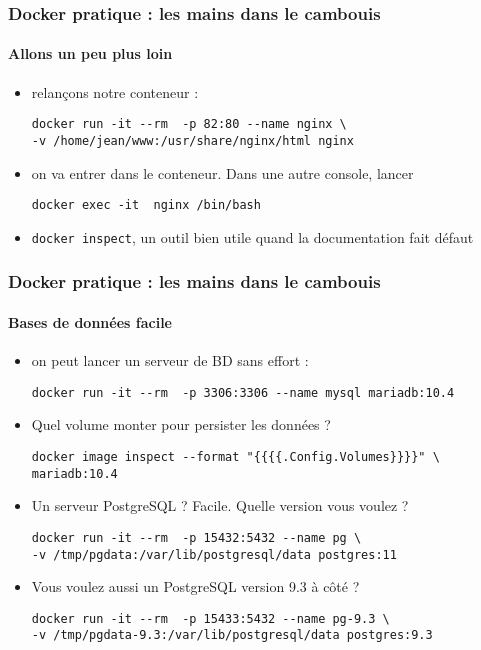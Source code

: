 \documentclass[11pt]{beamer}
\begin{document}
\begin{frame}[fragile]
\frametitle{Docker pratique : les mains dans le cambouis }
\framesubtitle{Allons un peu plus loin}
\begin{itemize}
	\item relançons notre conteneur : 
	\begin{lstlisting}
docker run -it --rm  -p 82:80 --name nginx \
-v /home/jean/www:/usr/share/nginx/html nginx
	\end{lstlisting}
	\item on va entrer dans le conteneur. Dans une autre console, lancer
	\begin{lstlisting}
docker exec -it  nginx /bin/bash
	\end{lstlisting}
	\item \verb|docker inspect|, un outil bien utile quand la documentation fait défaut
\end{itemize}
\end{frame}

\begin{frame}[fragile]
\frametitle{Docker pratique : les mains dans le cambouis }
\framesubtitle{Bases de données facile}
\begin{itemize}
	\item on peut lancer un serveur de BD sans effort : 
	\begin{lstlisting}
docker run -it --rm  -p 3306:3306 --name mysql mariadb:10.4
	\end{lstlisting}
	\item Quel volume monter pour persister les données ?
	\begin{lstlisting}
docker image inspect --format "{{{{.Config.Volumes}}}}" \
mariadb:10.4
	\end{lstlisting}
	\item Un serveur PostgreSQL ? Facile. Quelle version vous voulez ?
	\begin{lstlisting}
docker run -it --rm  -p 15432:5432 --name pg \ 
-v /tmp/pgdata:/var/lib/postgresql/data postgres:11
	\end{lstlisting}
	\item Vous voulez aussi un PostgreSQL version 9.3 à côté ?
	\begin{lstlisting}
docker run -it --rm  -p 15433:5432 --name pg-9.3 \
-v /tmp/pgdata-9.3:/var/lib/postgresql/data postgres:9.3
	\end{lstlisting}
\end{itemize}
\end{frame}
\end{document}
